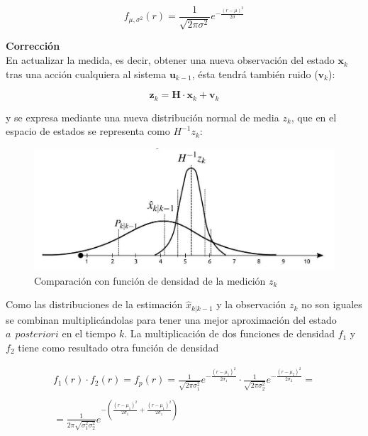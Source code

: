 \documentclass[twoside,11pt]{book}
\begin{document}
\begin{equation}
f_{\mu,\sigma^{2}}(r)=\frac{1}{\sqrt{2\pi \sigma^{2}}}e^{-\frac{(r-\mu)^{2}}{2\sigma}}
\end{equation}		

\textbf{Corrección}\\

En actualizar la medida, es decir, obtener una nueva observación del estado $\mathbf{x}_{k}$ tras una acción cualquiera al sistema  $\mathbf{u}_{k-1}$, ésta tendrá también ruido ($\mathbf{v}_{k}$):

\begin{equation}
\mathbf{z}_{k}=\mathbf{H} \cdot \mathbf{x}_{k} + \mathbf{v}_{k}
\end{equation}

y se expresa mediante una nueva distribución normal de media $z_{k}$, que en el espacio de estados se representa como $H^{-1}z_{k}$:

\begin{figure}[h!]
\begin{center}
\includegraphics[scale=0.35,bb=0 0 800 350]{images/comp_fun_dens_x.png}
\caption{Comparación con función de densidad de la medición $z_{k}$}
\end{center}
\end{figure}

Como las distribuciones de la estimación $\hat{x}_{k|k-1}$ y la observación $z_{k}$ no son iguales se combinan multiplicándolas para tener una mejor aproximación del estado $a \>\> posteriori$ en el tiempo $k$. La multiplicación de dos funciones de densidad $f_{1}$ y $f_{2}$ tiene como resultado otra función de densidad 

\begin{equation}
\begin{array}{c}
f_{1}(r) \cdot f_{2}(r) = f_{p}(r)= \frac{1}{\sqrt{2\pi \sigma^{2}_{1}}}e^{-\frac{(r-\mu_{1})^{2}}{2\sigma_{1}}} \cdot \frac{1}{\sqrt{2\pi \sigma^{2}_{2}}}e^{-\frac{(r-\mu_{2})^{2}}{2\sigma_{2}}} = \\   \\
=\frac{1}{2\pi \sqrt{\sigma^{2}_{1}\sigma^{2}_{2}}}e^{-\left(\frac{(r-\mu_{1})^{2}}{2\sigma_{1}}+\frac{(r-\mu_{1})^{2}}{2\sigma_{1}}\right)} \end{array}
\end{equation}
\end{document}
